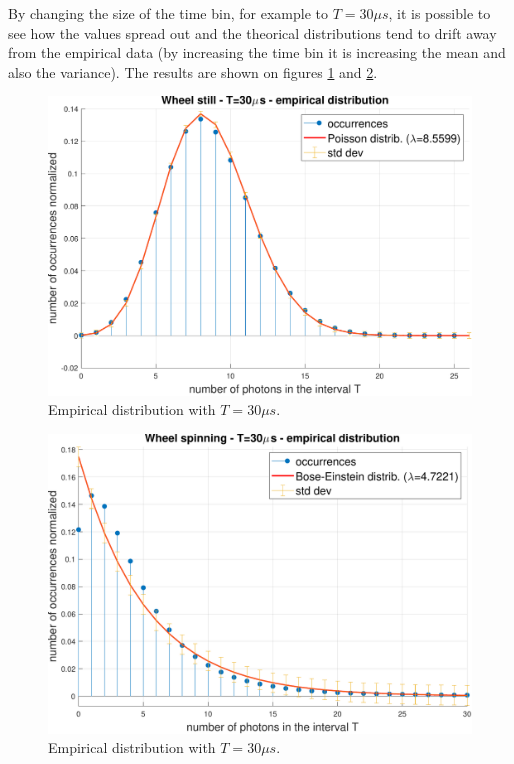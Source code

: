 By changing the size of the time bin, for example to $T=30\mu s$, it is possible to see how the values spread out and the theorical distributions tend to drift away from the empirical data (by increasing the time bin it is increasing the mean and also the variance). The results are shown on figures \ref{fig:still30} and \ref{fig:spinning30}.
\begin{figure}[H]
    \centering
    \includegraphics[width=.8\textwidth]{images/Still_Wheel_30.pdf}
    \caption{Empirical distribution with $T=30\mu s$.}
    \label{fig:still30}    
\end{figure}
\begin{figure}[H]
    \centering
    \includegraphics[width=.8\textwidth]{images/Spinning_Wheel_30.pdf}
    \caption{Empirical distribution with $T=30\mu s$.}
    \label{fig:spinning30}    
\end{figure}
